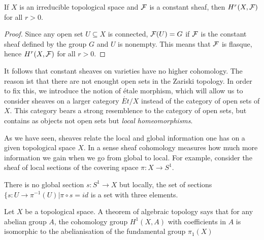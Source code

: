 \begin{theorem}
  If $X$ is an irreducible topological space and $\mathcal{F}$ is a constant sheaf, then $H^r(X, \mathcal{F})$ for all $r>0$.
\end{theorem}
\begin{proof}
  Since any open set $U \subseteq X$ is connected, $\mathcal{F}(U) = G$ if $\mathcal{F}$ is the constant sheaf defined by the group $G$ and $U$ is nonempty. This means that $\mathcal{F}$ is flasque, hence $H^r(X, \mathcal{F})$ for all $r>0$.
\end{proof}
It follows that constant sheaves on varieties have no higher cohomology. The reason ist that there are not enought open sets in the Zariski topology. In order to fix this, we introduce the notion of \'etale morphism, which will allow us to consider sheaves on a larger category $\acute{Et}/X$ instead of the category of open sets of $X$. This category bears a strong resemblence to the category of open sets, but contains as objects not open sets but \textit{local homeomorphisms}.

As we have seen, sheaves relate the local and global information one has on a given topological space $X$. In a sense sheaf cohomology measures how much more information we gain when we go from global to local. For example, consider the sheaf of local sections of the covering space $\pi : X \to S^1$.


There is no global section $s: S^1 \to X$ but locally, the set of sections $\{s: U \to \pi^{-1}(U) | \pi \circ s = id$ is a set with three elements.

Let $X$ be a topological space. A theorem of algebraic topology says that for any abelian group $A$, the cohomology group $H^1(X,A)$ with coefficients in $A$ is isomorphic to the abelianisation of the fundamental group $\pi_1(X)$